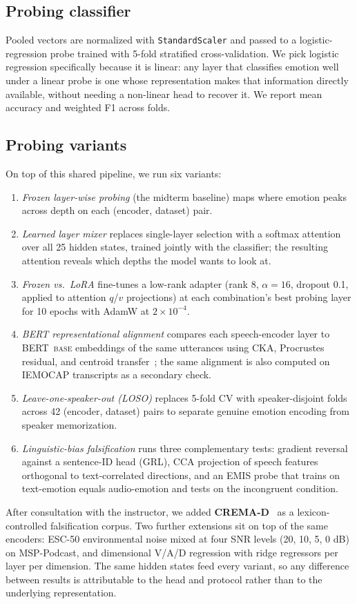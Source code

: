 \documentclass[sigconf,screen]{acmart}
\begin{document}
\subsection{Probing classifier}
Pooled vectors are normalized with \texttt{StandardScaler} and passed to a logistic-regression probe trained with 5-fold stratified cross-validation. We pick logistic regression specifically because it is linear: any layer that classifies emotion well under a linear probe is one whose representation makes that information directly available, without needing a non-linear head to recover it. We report mean accuracy and weighted F1 across folds.
\subsection{Probing variants}
\label{sec:probing_variants}
On top of this shared pipeline, we run six variants:
\begin{enumerate}
    \item \emph{Frozen layer-wise probing} (the midterm baseline) maps where emotion peaks across depth on each (encoder, dataset) pair.
    \item \emph{Learned layer mixer} replaces single-layer selection with a softmax attention over all 25 hidden states, trained jointly with the classifier; the resulting attention reveals which depths the model wants to look at.
    \item \emph{Frozen vs.\ LoRA} fine-tunes a low-rank adapter (rank 8, $\alpha{=}16$, dropout 0.1, applied to attention $q$/$v$ projections) at each combination's best probing layer for 10 epochs with AdamW at $2{\times}10^{-4}$.
    \item \emph{BERT representational alignment} compares each speech-encoder layer to BERT~\textsc{base} embeddings of the same utterances using CKA, Procrustes residual, and centroid transfer~\cite{kornblith2019cka}; the same alignment is also computed on IEMOCAP transcripts as a secondary check.
    \item \emph{Leave-one-speaker-out (LOSO)} replaces 5-fold CV with speaker-disjoint folds across 42 (encoder, dataset) pairs to separate genuine emotion encoding from speaker memorization.
    \item \emph{Linguistic-bias falsification} runs three complementary tests: gradient reversal against a sentence-ID head (GRL), CCA projection of speech features orthogonal to text-correlated directions, and an EMIS probe that trains on text-emotion equals audio-emotion and tests on the incongruent condition.
\end{enumerate}
After consultation with the instructor, we added \textbf{CREMA-D}~\cite{cao2014crema} as a lexicon-controlled falsification corpus. Two further extensions sit on top of the same encoders: ESC-50 environmental noise mixed at four SNR levels (20, 10, 5, 0 dB) on MSP-Podcast, and dimensional V/A/D regression with ridge regressors per layer per dimension. The same hidden states feed every variant, so any difference between results is attributable to the head and protocol rather than to the underlying representation.
\end{document}
